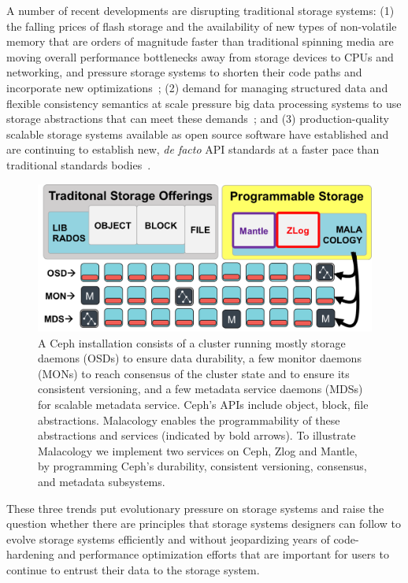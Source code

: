 \documentclass[10pt,twocolumn]{article}
\begin{document}
A number of recent developments are disrupting traditional storage
systems: (1) the falling prices of flash storage and the availability of
new types of non-volatile memory that are orders of magnitude faster
than traditional spinning media are moving overall performance
bottlenecks away from storage devices to CPUs and networking, and
pressure storage systems to shorten their code paths and incorporate new
optimizations~\cite{gray_tape_2007,gray_flash_2008}; (2) demand for managing structured data and flexible
consistency semantics at scale pressure big data processing systems to
use storage abstractions that can meet these demands~\cite{apache_contributors_parquet_2014}; and (3)
production-quality scalable storage systems available as open source
software have established and are continuing to establish new, \emph{de
facto} API standards at a faster pace than traditional standards bodies~\cite{snia_implementing_2014,linux_foundation_kinetic_2015}.

\begin{figure}[tb]
\centering
\includegraphics{figures/overview.png}
\caption{A Ceph installation consists of a cluster running mostly
storage daemons (OSDs) to ensure data durability, a few monitor daemons
(MONs) to reach consensus of the cluster state and to ensure its
consistent versioning, and a few metadata service daemons (MDSs) for
scalable metadata service. Ceph's APIs include object, block, file
abstractions. Malacology enables the programmability of these
abstractions and services (indicated by bold arrows). To illustrate Malacology we implement two
services on Ceph, Zlog and Mantle, by programming Ceph's durability,
consistent versioning, consensus, and metadata subsystems.
\label{fig:overview}}
\end{figure}

These three trends put evolutionary pressure on storage systems and
raise the question whether there are principles that storage systems
designers can follow to evolve storage systems efficiently and without
jeopardizing years of code-hardening and performance optimization
efforts that are important for users to continue to entrust their data
to the storage system.
\end{document}
